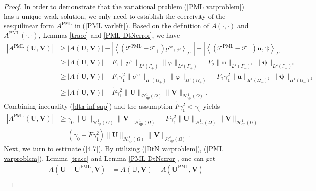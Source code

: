 \documentclass[final,3p,times]{elsarticle}
\begin{document}
\begin{proof}
	In order to demonstrate that the variational problem (\ref{PML varproblem}) has a unique weak solution, we only need to establish the coercivity of the sesquilinear form $A^{\mathrm{PML}}$ in (\ref{PML varleft}). Based on the definition of $A(\cdot,\cdot)$ and $A^{\mathrm{PML}}(\cdot,\cdot)$, Lemmas \ref{trace} and \ref{PML-DtNerror}, we have
	\begin{align*}
		|A^{\mathrm{PML}}(\boldsymbol{U}, \boldsymbol{V})| &\geq|A(\boldsymbol{U}, \boldsymbol{V})| - \left|\left\langle\left(\mathscr{T}_+^{\mathrm{PML}}-\mathscr{T}_+\right) p^\mathrm{sc}, \varphi\right\rangle_{\Gamma_-}\right| - 
		\left|\left\langle\left(\mathscr{T}_-^{\mathrm{PML}}-\mathscr{T}_-\right) \boldsymbol{u}, \boldsymbol{\psi}\right\rangle_{\Gamma_-}\right| \\
		&\geq|A(\boldsymbol{U}, \boldsymbol{V})| - F_1\|p^\mathrm{sc}\|_{L^2(\Gamma_+)}\|\varphi\|_{L^2(\Gamma_+)}- F_2\|\boldsymbol{u}\|_{L^2(\Gamma_-)^2}\|\boldsymbol{\psi}\|_{L^2(\Gamma_-)^2}\\
		&\geq|A(\boldsymbol{U}, \boldsymbol{V})| - F_1\gamma_1^2\|p^\mathrm{sc}\|_{H^1(\Omega_+)}\|\varphi\|_{H^1(\Omega_+)}- F_2\gamma_1^2\|\boldsymbol{u}\|_{H^1(\Omega_-)^2}\|\boldsymbol{\psi}\|_{H^1(\Omega_-)^2}\\
		&\geq|A(\boldsymbol{U}, \boldsymbol{V})| - \widetilde{F}\gamma_1^2\|\boldsymbol{U}\|_{\mathscr{H}^1_\mathrm{qp}(\Omega)}\|\boldsymbol{V}\|_{\mathscr{H}^1_\mathrm{qp}(\Omega)}.
	\end{align*}
	Combining inequality (\ref{dtn inf-sup}) and the assumption $\widetilde{F}\gamma_1^2<\gamma_0$ yields
	\begin{align*}
		|A^{\mathrm{PML}}(\boldsymbol{U}, \boldsymbol{V})|
		&\geq \gamma_0 \|\boldsymbol{U}\|_{\mathscr{H}^1_\mathrm{qp}(\Omega)}\|\boldsymbol{V}\|_{\mathscr{H}^1_\mathrm{qp}(\Omega)}- \widetilde{F}\gamma_1^2\|\boldsymbol{U}\|_{\mathscr{H}^1_\mathrm{qp}(\Omega)}\|\boldsymbol{V}\|_{\mathscr{H}^1_\mathrm{qp}(\Omega)}\\
		&=(\gamma_0-\widetilde{F}\gamma_1^2)\|\boldsymbol{U}\|_{\mathscr{H}^1_\mathrm{qp}(\Omega)}\|\boldsymbol{V}\|_{\mathscr{H}^1_\mathrm{qp}(\Omega)}.
	\end{align*}
	Next, we turn to estimate (\ref{4.7}). By utilizing (\ref{DtN varproblem}), (\ref{PML varproblem}), Lemma \ref{trace} and Lemma \ref{PML-DtNerror}, one can get
	\begin{align*}
		A\left(\boldsymbol{U}-\boldsymbol{U}^{\mathrm{PML}}, \boldsymbol{V}\right)
		&=A\left(\boldsymbol{U},\boldsymbol{V}\right)-A\left(\boldsymbol{U}^{\mathrm{PML}}, \boldsymbol{V}\right)\\

\end{align*}
\end{proof}
\end{document}
